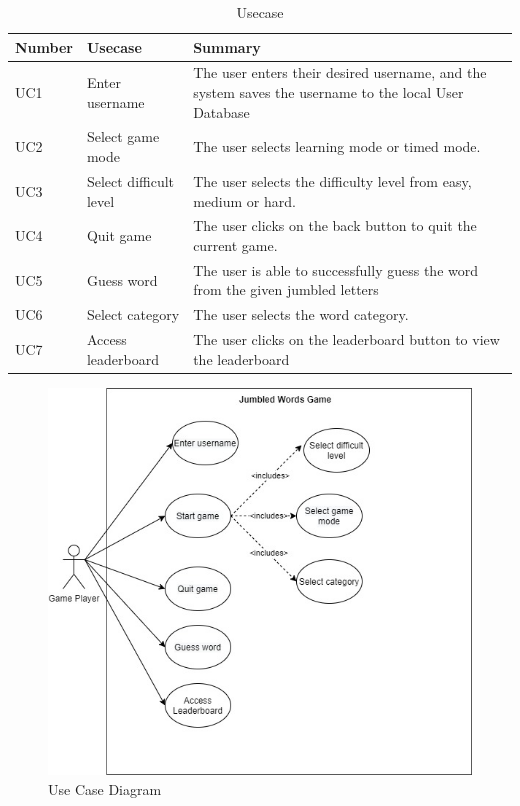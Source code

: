 \documentclass[12pt, titlepage]{article}
\begin{document}
\begin{table}[h]
	\begin{center}
		\begin{tabular}{|p{}|p{}|p{}|}
			\hline
			Number & Usecase & Summary\\ 
			\hline
			UC1 & Enter username & The user enters their desired username, and the system saves the username to the local User Database \\
			\hline
			UC2 & Select game mode & The user selects learning mode or timed mode. \\ 
			\hline
			UC3 & Select difficult level & The user selects the difficulty level from easy, medium or hard. \\
			\hline
			UC4 & Quit game & The user clicks on the back button to quit the current game. \\
			\hline
			UC5 & Guess word & The user is able to successfully guess the word from the given jumbled letters\\
			\hline
			UC6 & Select category & The user selects the word category. \\
			\hline
			UC7 & Access leaderboard  & The user clicks on the leaderboard button to view the leaderboard \\
			\hline
		\end{tabular}
	\end{center}
	\caption{Usecase}
	\label{tab:my_label}
\end{table}

\begin{figure}[]
	\centering
	\includegraphics[width=\textwidth]{usecase_2}
	\caption{Use Case Diagram}
\end{figure}
\end{document}
